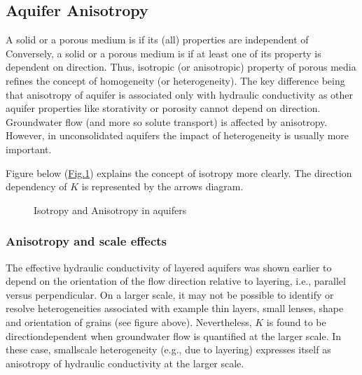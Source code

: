 \documentclass[letterpaper,10pt,english]{sphinxmanual}
\begin{document}
\subsection{Aquifer Anisotropy}
\label{\detokenize{contents/flow/lecture_05/15_het_iso:aquifer-anisotropy}}
A solid or a porous medium is  if its (all) properties are independent of  Conversely, a solid or a porous medium is  if at least one of its property is dependent on direction. Thus, isotropic (or anisotropic) property of porous media refines the concept of homogeneity (or heterogeneity). The key difference being that anisotropy of aquifer is associated only with hydraulic conductivity as other aquifer properties like storativity or porosity cannot depend on direction. Groundwater flow (and more so solute transport) is affected by anisotropy. However, in unconsolidated aquifers the impact of heterogeneity is usually more important.

Figure below (\hyperref[\detokenize{contents/flow/lecture_05/15_het_iso:iso-anisotropy}]{Fig.\@ \ref{\detokenize{contents/flow/lecture_05/15_het_iso:iso-anisotropy}}}) explains the concept of isotropy more clearly. The direction dependency of \(K\) is represented by the arrows diagram.

\begin{figure}[htbp]
\centering
\capstart

\noindent{}
\caption{Isotropy and Anisotropy in aquifers}\label{\detokenize{contents/flow/lecture_05/15_het_iso:iso-anisotropy}}\end{figure}


\subsubsection{Anisotropy and scale effects}
\label{\detokenize{contents/flow/lecture_05/15_het_iso:anisotropy-and-scale-effects}}
The effective hydraulic conductivity of layered aquifers was shown earlier to depend on the orientation of the flow direction relative to layering, i.e., parallel versus perpendicular. On a larger scale, it may not be possible to identify or resolve heterogeneities associated with example thin layers, small lenses, shape and orientation of grains (see figure above). Nevertheless, \(K\) is found to be direction\sphinxhyphen{}dependent when groundwater flow is quantified at the larger scale. In these case, small\sphinxhyphen{}scale heterogeneity (e.g., due to layering) expresses itself as anisotropy of hydraulic conductivity at the larger scale.
\end{document}
